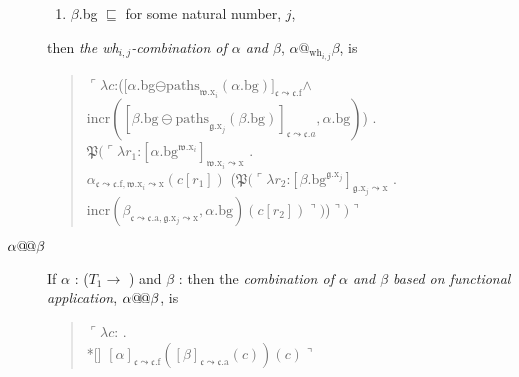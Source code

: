 \begin{description}
\begin{enumerate}
  \item $\beta$.bg $\sqsubseteq$  for some natural number,
    $j$,
  \end{enumerate}
  then \textit{the \textit{wh}$_{i,j}$-combination of $\alpha$ and
    $\beta$}, $\alpha\text{@}_{\mathrm{wh}_{i,j}}\beta$, is
  \begin{quote}
    $\ulcorner\lambda
    c$:([$\alpha$.bg$\ominus\mathrm{paths}_{\mathfrak{w}.\text{x}_i}(\alpha.\text{bg})]_{\mathfrak{c}\leadsto\mathfrak{c}.\text{f}}$\d{$\wedge$}\\
    \hspace*{5em}$\mathrm{incr}([\beta.\text{bg}\ominus\mathrm{paths}_{\mathfrak{g}.\text{x}_j}(\beta.\text{bg})]_{\mathfrak{c}\leadsto\mathfrak{c}.a},\alpha.\text{bg})$)
    . \\
    \hspace*{1em} $\mathfrak{P}(\ulcorner\lambda r_1$:$[\alpha.\text{bg}^{\mathfrak{w}.\text{x}_i}]_{\mathfrak{w}.\text{x}_i\leadsto\text{x}}$ . \\
    \hspace*{4em}$\alpha_{\mathfrak{c}\leadsto\mathfrak{c}.\text{f},\mathfrak{w}.\text{x}_i\leadsto\text{x}}(c[r_1])$
    ($\mathfrak{P}(\ulcorner\lambda r_2$:$[\beta.\text{bg}^{\mathfrak{g}.\text{x}_j}]_{\mathfrak{g}.\text{x}_j\leadsto\text{x}}$ . \\
    \hspace*{15em}$\mathrm{incr}(\beta_{\mathfrak{c}\leadsto\mathfrak{c}.\text{a},\mathfrak{g}.\text{x}_j\leadsto\text{x}},\alpha.\text{bg})(c[r_2])\urcorner)$)$\urcorner)\urcorner$
  \end{quote} 

  \item[\textnormal{$\alpha\text{@\!@}\beta$}] \mbox{}

  If $\alpha$ : ($T_1\rightarrow$ ) 
                         and $\beta$ : 
                         then the \textit{combination of $\alpha$ and
    $\beta$  based on functional application}, $\alpha\text{@\!@}\beta$, is
  \begin{quote}
    $\ulcorner\lambda c$:
      . \\*[\baselineskip]
      \hspace*{10em}$[\alpha]_{\mathfrak{c}\leadsto\mathfrak{c}.\text{f}}([\beta]_{\mathfrak{c}\leadsto\mathfrak{c}.\text{a}}(c))(c)\urcorner$
    \end{quote}


\end{description}
